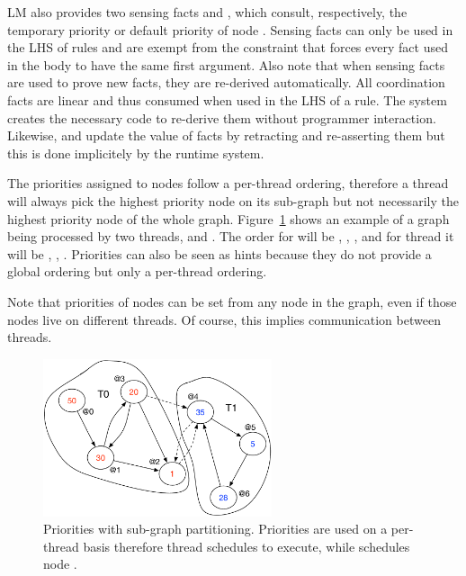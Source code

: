 LM also provides two sensing facts  and
, which consult, respectively, the
temporary priority or default priority  of node .  Sensing facts
can only be used in the LHS of rules and are exempt from the constraint that
forces every fact used in the body to have the same first argument. Also note
that when sensing facts are used to prove new facts, they are re-derived
automatically. All coordination facts are linear and thus consumed when used in
the LHS of a rule.  The system creates the necessary code to re-derive them
without programmer interaction. Likewise,  and
 update the value of  facts by
retracting and re-asserting them but this is done implicitely by the runtime
system.

The priorities assigned to nodes follow a per-thread ordering, therefore a
thread will always pick the highest priority node on its sub-graph but not
necessarily the highest priority node of the whole graph.
Figure~\ref{fig:coordination:priorities} shows an example of a graph being
processed by two threads,  and . The order for  will
be , , ,  and for thread  it will
be , , . Priorities can also be seen as hints because
they do not provide a global ordering but only a per-thread ordering.

Note that priorities of nodes can be set from any node in the graph, even if those nodes
live on different threads. Of course, this implies communication between
threads.

\begin{figure}
\begin{center}
   \includegraphics[width=0.6\textwidth]{figures/coordination/priorities.pdf}
\end{center}
\caption{Priorities with sub-graph partitioning. Priorities are used on a
   per-thread basis therefore thread  schedules  to
   execute, while  schedules node .}
\label{fig:coordination:priorities}
\end{figure}

